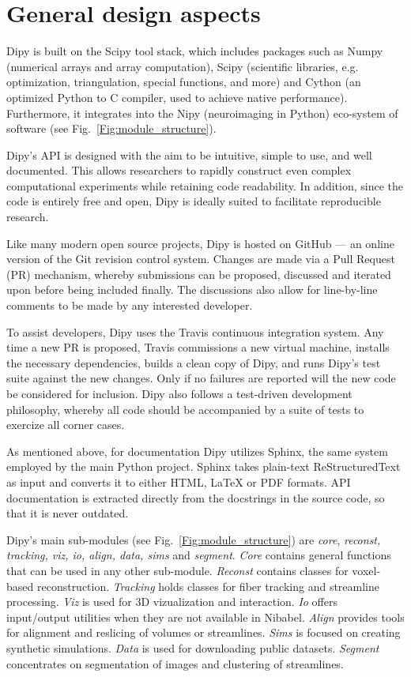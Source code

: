 \documentclass{bioinfo}
\begin{document}
\section{General design aspects}

Dipy is built on the Scipy tool stack, which includes packages such as
Numpy (numerical arrays and array computation), Scipy
(scientific libraries, e.g. optimization, triangulation, special functions,
and more) and Cython (an optimized Python to C compiler, used to achieve
native performance).  Furthermore, it integrates into the Nipy (neuroimaging
in Python) eco-system of software (see Fig.~\ref{Fig:module_structure}).

Dipy's API is designed with the aim to be intuitive, simple to use, and well
documented.  This allows researchers to rapidly construct even complex
computational experiments while retaining code readability.  In addition,
since the code is entirely free and open, Dipy is ideally suited to facilitate
reproducible research.

Like many modern open source projects, Dipy is hosted on GitHub --- an online
version of the Git revision control system. Changes are made via a Pull
Request (PR) mechanism, whereby submissions can be proposed, discussed and
iterated upon before being included finally. The discussions also allow for
line-by-line comments to be made by any interested developer.

To assist developers, Dipy uses the Travis continuous integration system.  Any
time a new PR is proposed, Travis commissions a new virtual machine, installs
the necessary dependencies, builds a clean copy of Dipy, and runs Dipy's
test suite against the new changes.  Only if no failures are reported will the
new code be considered for inclusion.  Dipy also follows a test-driven
development philosophy, whereby all code should be accompanied by a suite of
tests to exercize all corner cases.

As mentioned above, for documentation Dipy utilizes Sphinx, the same system
employed by the main Python project.  Sphinx takes plain-text ReStructuredText
as input and converts it to either HTML, LaTeX or PDF formats.  API
documentation is extracted directly from the docstrings in the source code, so
that it is never outdated.

Dipy's main sub-modules (see Fig.~\ref{Fig:module_structure}) are \emph{core},
\emph{reconst, tracking, viz, io, align, data, sims} and \emph{segment}.
\emph{Core} contains general functions that can be used in any other sub-module.
\emph{Reconst} contains classes for voxel-based reconstruction. \emph{Tracking}
holds classes for fiber tracking and streamline processing. \emph{Viz} is used
 for 3D vizualization and interaction. \emph{Io} offers input/output utilities
when they are not available in Nibabel. \emph{Align} provides tools for
alignment and reslicing of volumes or streamlines. \emph{Sims} is focused on
creating synthetic simulations. \emph{Data} is used for downloading public
datasets. \emph{Segment} concentrates on segmentation of images and clustering
of streamlines.
\end{document}
